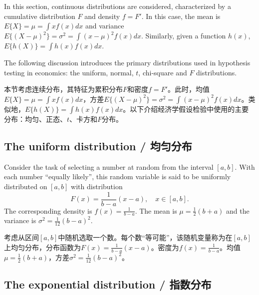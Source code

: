 \begin{original}
In this section, continuous distributions are considered, characterized by a cumulative distribution $F$ and density $f = F'$. In this case, the mean is $E\{X\} = \mu = \int x f(x)dx$ and variance $E\{(X - \mu)^2\} = \sigma^2 = \int (x - \mu)^2 f(x)dx$. Similarly, given a function $h(x)$, $E\{h(X)\} = \int h(x) f(x)dx$.

The following discussion introduces the primary distributions used in hypothesis testing in economics: the uniform, normal, $t$, chi-square and $F$ distributions.
\end{original}
\begin{translation}
本节考虑连续分布，其特征为累积分布$F$和密度$f = F'$。此时，均值$E\{X\} = \mu = \int x f(x)dx$，方差$E\{(X - \mu)^2\} = \sigma^2 = \int (x - \mu)^2 f(x)dx$。类似地，$E\{h(X)\} = \int h(x) f(x)dx$。以下介绍经济学假设检验中使用的主要分布：均匀、正态、$t$、卡方和$F$分布。
\end{translation}

\subsection{The uniform distribution / 均匀分布}

\begin{original}
Consider the task of selecting a number at random from the interval $[a, b]$. With each number ``equally likely'', this random variable is said to be uniformly distributed on $[a, b]$ with distribution
\[
F(x) = \frac{1}{b-a}(x - a), \quad x \in [a, b].
\]
The corresponding density is $f(x) = \frac{1}{b-a}$. The mean is $\mu = \frac{1}{2}(b + a)$ and the variance is $\sigma^2 = \frac{1}{12}(b - a)^2$.
\end{original}
\begin{translation}
考虑从区间$[a, b]$中随机选取一个数。每个数``等可能''，该随机变量称为在$[a, b]$上均匀分布，分布函数为$F(x) = \frac{1}{b-a}(x - a)$。密度为$f(x) = \frac{1}{b-a}$。均值$\mu = \frac{1}{2}(b + a)$，方差$\sigma^2 = \frac{1}{12}(b - a)^2$。
\end{translation}

\subsection{The exponential distribution / 指数分布}


